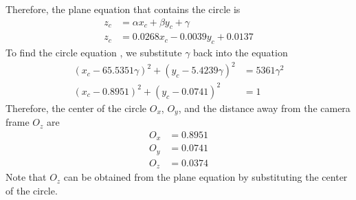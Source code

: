 \documentclass[]{article}
\begin{document}
\indent Therefore, the plane equation that contains the circle is
\begin{align*}
z_c &= \alpha x_c + \beta y_c + \gamma\\
z_c &= 0.0268x_c - 0.0039y_c + 0.0137
\end{align*}
\indent To find the circle equation , we substitute $\gamma$ back into the equation
\begin{align*}
(x_c-65.5351\gamma)^2+(y_c-5.4239\gamma)^2 &= 5361\gamma^2\\
(x_c-0.8951)^2+(y_c-0.0741)^2 &= 1
\end{align*}
\indent Therefore, the center of the circle $O_x$, $O_y$, and the distance away from the camera frame $O_z$ are
\begin{align*}
O_x &= 0.8951\\
O_y &= 0.0741\\
O_z &= 0.0374
\end{align*}
\indent Note that $O_z$ can be obtained from the plane equation by substituting the center of the circle.
\end{document}
